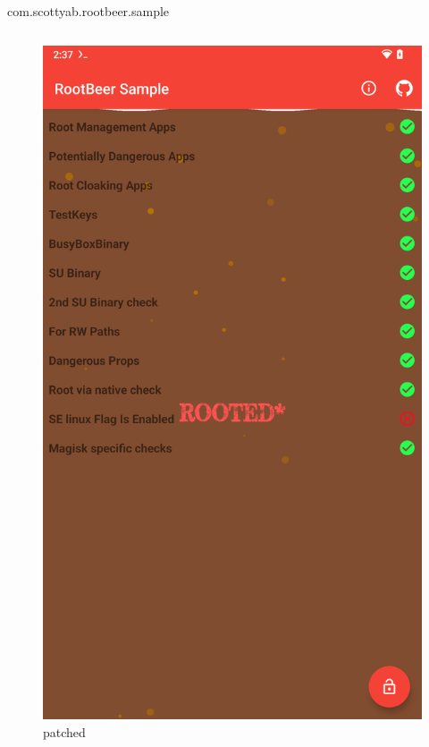 \documentclass{beamer}
\begin{document}
\begin{frame}[fragile]{com.scottyab.rootbeer.sample}
\begin{columns}
\begin{figure}
            \centering
            \includegraphics[scale=0.07]{rootbeer-patched.png}
            \caption{patched}
        \end{figure}
    \end{columns}
\end{frame}
\end{document}
